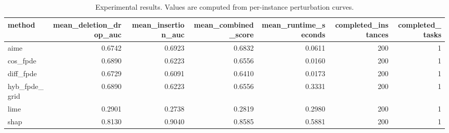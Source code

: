 \begin{table}[t]
\caption{Experimental results. Values are computed from per-instance perturbation curves.}
\label{tab:main_results_computed}
\centering
\begin{tabular}{lrrrrrr}
\toprule
method & mean\_deletion\_drop\_auc & mean\_insertion\_auc & mean\_combined\_score & mean\_runtime\_seconds & completed\_instances & completed\_tasks \\
\midrule
aime & 0.6742 & 0.6923 & 0.6832 & 0.0611 & 200 & 1 \\
cos\_fpde & 0.6890 & 0.6223 & 0.6556 & 0.0160 & 200 & 1 \\
diff\_fpde & 0.6729 & 0.6091 & 0.6410 & 0.0173 & 200 & 1 \\
hyb\_fpde\_grid & 0.6890 & 0.6223 & 0.6556 & 0.3331 & 200 & 1 \\
lime & 0.2901 & 0.2738 & 0.2819 & 0.2980 & 200 & 1 \\
shap & 0.8130 & 0.9040 & 0.8585 & 0.5881 & 200 & 1 \\
\bottomrule
\end{tabular}

\end{table}
